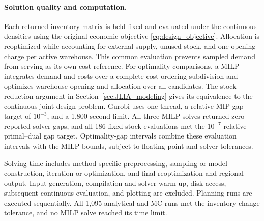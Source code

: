 \documentclass[a4paper,fleqn]{cas-sc}
\theoremstyle{remark}
\theoremstyle{plain}
\begin{document}
\paragraph{Solution quality and computation.}
Each returned inventory matrix is held fixed and evaluated under the continuous densities using the original economic objective \eqref{eq:design_objective}. Allocation is reoptimized while accounting for external supply, unused stock, and one opening charge per active warehouse. This common evaluation prevents sampled demand from serving as its own cost reference. For optimality comparisons, a MILP integrates demand and costs over a complete cost-ordering subdivision and optimizes warehouse opening and allocation over all candidates. The stock-reduction argument in Section~\ref{sec:JLIA_modeling} gives its equivalence to the continuous joint design problem. Gurobi uses one thread, a relative MIP-gap target of $10^{-3}$, and a 1,800-second limit. All three MILP solves returned zero reported solver gaps, and all 186 fixed-stock evaluations met the $10^{-7}$ relative primal--dual gap target. Optimality-gap intervals combine these evaluation intervals with the MILP bounds, subject to floating-point and solver tolerances.

Solving time includes method-specific preprocessing, sampling or model construction, iteration or optimization, and final reoptimization and regional output. Input generation, compilation and solver warm-up, disk access, subsequent continuous evaluation, and plotting are excluded. Planning runs are executed sequentially. All 1,095 analytical and MC runs met the inventory-change tolerance, and no MILP solve reached its time limit.
\end{document}
